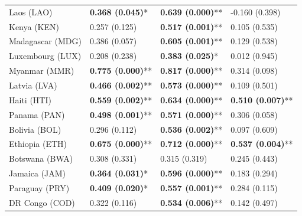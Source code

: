\begin{longtable}{p{5cm}p{3cm}p{3cm}p{5cm}}
Laos (LAO) & \textcolor{atlLime600}{\textbf{0.368 (0.045)}*} & \textcolor{atlLime600}{\textbf{0.639 (0.000)}**} & \textcolor{atlOrange600}{-0.160 (0.398)} \\
Kenya (KEN) & \textcolor{atlOrange600}{0.257 (0.125)} & \textcolor{atlLime600}{\textbf{0.517 (0.001)}**} & \textcolor{atlOrange600}{0.105 (0.535)} \\
Madagascar (MDG) & \textcolor{atlOrange600}{0.386 (0.057)} & \textcolor{atlLime600}{\textbf{0.605 (0.001)}**} & \textcolor{atlOrange600}{0.129 (0.538)} \\
Luxembourg (LUX) & \textcolor{atlOrange600}{0.208 (0.238)} & \textcolor{atlLime600}{\textbf{0.383 (0.025)}*} & \textcolor{atlOrange600}{0.012 (0.945)} \\
Myanmar (MMR) & \textcolor{atlLime600}{\textbf{0.775 (0.000)}**} & \textcolor{atlLime600}{\textbf{0.817 (0.000)}**} & \textcolor{atlOrange600}{0.314 (0.098)} \\
Latvia (LVA) & \textcolor{atlLime600}{\textbf{0.466 (0.002)}**} & \textcolor{atlLime600}{\textbf{0.573 (0.000)}**} & \textcolor{atlOrange600}{0.109 (0.501)} \\
Haiti (HTI) & \textcolor{atlLime600}{\textbf{0.559 (0.002)}**} & \textcolor{atlLime600}{\textbf{0.634 (0.000)}**} & \textcolor{atlLime600}{\textbf{0.510 (0.007)}**} \\
Panama (PAN) & \textcolor{atlLime600}{\textbf{0.498 (0.001)}**} & \textcolor{atlLime600}{\textbf{0.571 (0.000)}**} & \textcolor{atlOrange600}{0.306 (0.058)} \\
Bolivia (BOL) & \textcolor{atlOrange600}{0.296 (0.112)} & \textcolor{atlLime600}{\textbf{0.536 (0.002)}**} & \textcolor{atlOrange600}{0.097 (0.609)} \\
Ethiopia (ETH) & \textcolor{atlLime600}{\textbf{0.675 (0.000)}**} & \textcolor{atlLime600}{\textbf{0.712 (0.000)}**} & \textcolor{atlLime600}{\textbf{0.537 (0.004)}**} \\
Botswana (BWA) & \textcolor{atlOrange600}{0.308 (0.331)} & \textcolor{atlOrange600}{0.315 (0.319)} & \textcolor{atlOrange600}{0.245 (0.443)} \\
Jamaica (JAM) & \textcolor{atlLime600}{\textbf{0.364 (0.031)}*} & \textcolor{atlLime600}{\textbf{0.596 (0.000)}**} & \textcolor{atlOrange600}{0.183 (0.294)} \\
Paraguay (PRY) & \textcolor{atlLime600}{\textbf{0.409 (0.020)}*} & \textcolor{atlLime600}{\textbf{0.557 (0.001)}**} & \textcolor{atlOrange600}{0.284 (0.115)} \\
DR Congo (COD) & \textcolor{atlOrange600}{0.322 (0.116)} & \textcolor{atlLime600}{\textbf{0.534 (0.006)}**} & \textcolor{atlOrange600}{0.142 (0.497)} \\

\end{longtable}
